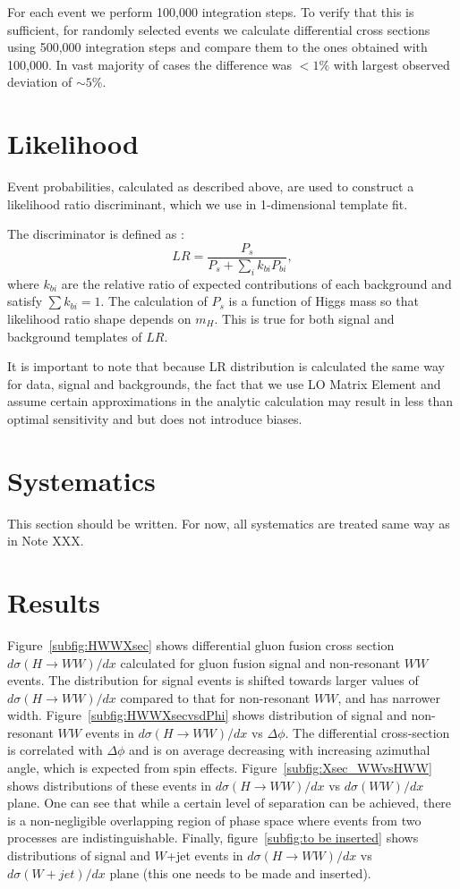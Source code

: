 \documentclass{cmspaper}
\begin{document}
For each event we perform 100,000 integration steps. To verify that this is sufficient, for randomly selected events we calculate differential cross
sections using 500,000 integration steps and compare them to the ones obtained with 100,000. In vast majority of cases the difference was $< 1\%$ with
largest observed deviation of $\sim 5\%$. 


\section{Likelihood}
Event probabilities, calculated as described above, are used to construct 
a likelihood ratio discriminant, which we use in 1-dimensional template fit.  

The discriminator is defined as :
\begin{equation}
\label{eqn:LR}
LR = \frac { P_s} { P_s + \sum_i k_{bi} P_{bi}},
\end{equation}
where $k_{bi}$ are the relative ratio of expected contributions of each background
and satisfy $\sum k_{bi} =1$.
The calculation of $P_s$ is a function of Higgs mass so that likelihood ratio
shape depends on $m_H$. This is true for both signal and background templates of $LR$.

It is important to note that because LR distribution is calculated the same way for data, 
signal and backgrounds, the fact that we use LO Matrix Element and assume certain 
approximations in the analytic calculation may result in less than optimal sensitivity 
and but does not introduce biases.

\section{Systematics}
This section should be written. For now, all systematics are treated same way as in Note XXX.


\section{Results}

Figure~\ref{subfig:HWWXsec} shows differential gluon fusion cross section $d\sigma(H \rightarrow WW)/dx$ calculated
for gluon fusion signal and non-resonant $WW$ events. The distribution for signal events is shifted towards larger values of  $d\sigma(H \rightarrow WW)/dx$
compared to that for non-resonant $WW$, and has narrower width. Figure~\ref{subfig:HWWXsecvsdPhi} shows distribution of signal and non-resonant $WW$ events in  
$d\sigma(H \rightarrow WW)/dx$ vs $\Delta\phi$. The differential cross-section is correlated with $\Delta\phi$ and is on average decreasing with increasing 
azimuthal angle, which is expected from spin effects. Figure~\ref{subfig:Xsec_WWvsHWW} shows distributions of these events in $d\sigma(H \rightarrow WW)/dx$ 
vs $d\sigma(WW)/dx$ plane. One can see that while a certain level of separation can be achieved, there is a non-negligible overlapping region of phase space where
events from two processes are indistinguishable. Finally, figure~\ref{subfig:to be inserted} shows distributions of signal and $W$+jet 
events in $d\sigma(H \rightarrow WW)/dx$ vs $d\sigma(W+jet)/dx$ plane (this one needs to be made and inserted).
\end{document}
